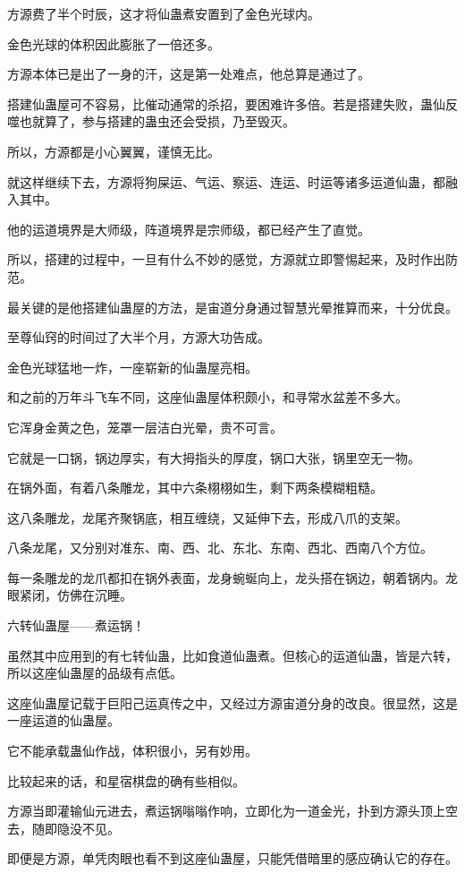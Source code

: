 \begin{this_body}
方源费了半个时辰，这才将仙蛊煮安置到了金色光球内。

金色光球的体积因此膨胀了一倍还多。

方源本体已是出了一身的汗，这是第一处难点，他总算是通过了。

搭建仙蛊屋可不容易，比催动通常的杀招，要困难许多倍。若是搭建失败，蛊仙反噬也就算了，参与搭建的蛊虫还会受损，乃至毁灭。

所以，方源都是小心翼翼，谨慎无比。

就这样继续下去，方源将狗屎运、气运、察运、连运、时运等诸多运道仙蛊，都融入其中。

他的运道境界是大师级，阵道境界是宗师级，都已经产生了直觉。

所以，搭建的过程中，一旦有什么不妙的感觉，方源就立即警惕起来，及时作出防范。

最关键的是他搭建仙蛊屋的方法，是宙道分身通过智慧光晕推算而来，十分优良。

至尊仙窍的时间过了大半个月，方源大功告成。

金色光球猛地一炸，一座崭新的仙蛊屋亮相。

和之前的万年斗飞车不同，这座仙蛊屋体积颇小，和寻常水盆差不多大。

它浑身金黄之色，笼罩一层洁白光晕，贵不可言。

它就是一口锅，锅边厚实，有大拇指头的厚度，锅口大张，锅里空无一物。

在锅外面，有着八条雕龙，其中六条栩栩如生，剩下两条模糊粗糙。

这八条雕龙，龙尾齐聚锅底，相互缠绕，又延伸下去，形成八爪的支架。

八条龙尾，又分别对准东、南、西、北、东北、东南、西北、西南八个方位。

每一条雕龙的龙爪都扣在锅外表面，龙身蜿蜒向上，龙头搭在锅边，朝着锅内。龙眼紧闭，仿佛在沉睡。

六转仙蛊屋——煮运锅！

虽然其中应用到的有七转仙蛊，比如食道仙蛊煮。但核心的运道仙蛊，皆是六转，所以这座仙蛊屋的品级有点低。

这座仙蛊屋记载于巨阳己运真传之中，又经过方源宙道分身的改良。很显然，这是一座运道的仙蛊屋。

它不能承载蛊仙作战，体积很小，另有妙用。

比较起来的话，和星宿棋盘的确有些相似。

方源当即灌输仙元进去，煮运锅嗡嗡作响，立即化为一道金光，扑到方源头顶上空去，随即隐没不见。

即便是方源，单凭肉眼也看不到这座仙蛊屋，只能凭借暗里的感应确认它的存在。


\end{this_body}
